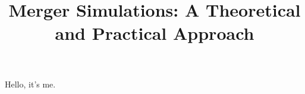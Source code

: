 \documentclass{tfg}
\begin{document}


\title{Merger Simulations: A Theoretical and Practical Approach}


\def\autor{Andrea Dana Klein Villalba}

\def\treball{Bachelor's Degree Thesis}

\def\advisor{Jordi Perdiguero Garc\'ia}

\vfill

\def\departament{Departament d'Economia Aplicada}



\maketitle











\setcounter{page}{5}
\markboth{}{}

\begin{abstracteng}

\keywordseng{}

\vspace{1cm}

Hello, it's me.
 

\end{abstracteng}
\end{document}
